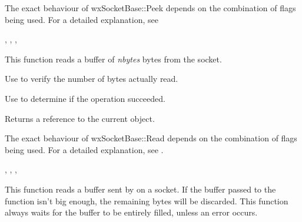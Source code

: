 The exact behaviour of wxSocketBase::Peek depends on the combination
of flags being used. For a detailed explanation, see 


, 
, 
, 

%
%
\label{wxsocketbaseread}


This function reads a buffer of {\it nbytes} bytes from the socket.

Use  to verify the number of bytes actually read.

Use  to determine if the operation succeeded.





Returns a reference to the current object.


The exact behaviour of wxSocketBase::Read depends on the combination
of flags being used. For a detailed explanation, see .


, 
, 
, 

%
%
\label{wxsocketbasereadmsg}


This function reads a buffer sent by 
on a socket. If the buffer passed to the function isn't big enough, the
remaining bytes will be discarded. This function always waits for the
buffer to be entirely filled, unless an error occurs.

